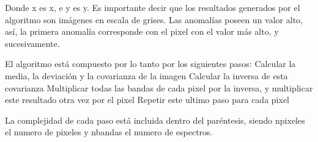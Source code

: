 Donde x es x, e y es y. Es importante decir que los resultados generados por el algoritmo son imágenes en escala de grises. Las anomalías poseen un valor alto, así, la primera anomalía corresponde con el pixel con el valor más alto, y sucesivamente.

El algoritmo está compuesto por lo tanto por los siguientes pasos:
Calcular la media, la deviación y la covarianza de la imagen
Calcular la inversa de esta covarianza
Multiplicar todas las bandas de cada pixel por la inversa, y multiplicar este resultado otra vez por el pixel
Repetir este ultimo paso para cada pixel

La complejidad de cada paso está incluida dentro del paréntesis, siendo npixeles el numero de pixeles y nbandas el numero de espectros.

